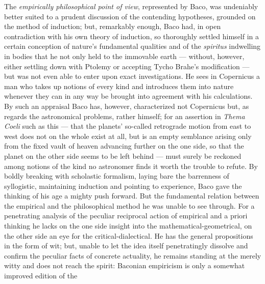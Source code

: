 \documentclass[12pt,a4paper]{book}
\begin{document}
The \emph{empirically philosophical point of view}, represented by Baco, was undeniably better suited to a
prudent discussion of the contending hypotheses, grounded on the method of induction; but, remarkably
enough, Baco had, in open contradiction with his own theory of induction, so thoroughly settled himself in a
certain conception of nature's fundamental qualities and of the \emph{spiritus} indwelling in bodies that he
not only held to the immovable earth --- without, however, either settling down with Ptolemy or accepting
Tycho Brahe's modification --- but was not even able to enter upon exact investigations. He sees in
Copernicus a man who takes up notions of every kind and introduces them into nature whenever they can in any
way be brought into agreement with his calculations. By such an appraisal Baco has, however, characterized
not Copernicus but, as regards the astronomical problems,
rather himself; for an assertion in \textit{Thema Coeli} such as this --- that the planets' so-called
retrograde motion from east to west does not on the whole exist at all, but is an empty semblance arising
only from the fixed vault of heaven advancing further on the one side, so that the planet on the other side
seems to be left behind --- must surely be reckoned among notions of the kind no astronomer finds it worth
the trouble to refute. By boldly breaking with scholastic formalism, laying bare the barrenness of
syllogistic, maintaining induction and pointing to experience, Baco gave the thinking of his age a mighty
push forward. But the fundamental relation between the empirical and the philosophical method he was unable
to see through. For a penetrating analysis of the peculiar reciprocal action of empirical and a priori
thinking he lacks on the one side insight into the mathematical-geometrical, on the other side an eye for the
critical-dialectical. He has the general propositions in the form of wit; but, unable to let the idea itself
penetratingly dissolve and confirm the peculiar facts of concrete actuality, he remains standing at the
merely witty and does not reach the spirit: Baconian empiricism is only a somewhat improved edition of the
\end{document}
